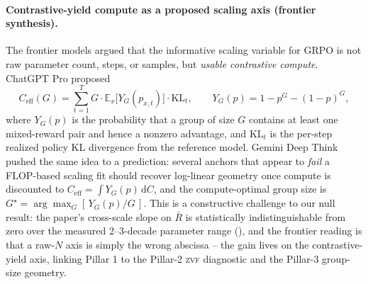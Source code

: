 \paragraph{Contrastive-yield compute as a proposed scaling axis (frontier synthesis).}
The frontier models argued that the informative scaling variable for GRPO is
not raw parameter count, steps, or samples, but \emph{usable contrastive
compute}. ChatGPT Pro proposed
\begin{equation}
  \label{eq:frontier-ceff}
  C_{\mathrm{eff}}(G) = \sum_{t=1}^{T} G \cdot
      \mathbb{E}_x\!\bigl[Y_G(p_{x,t})\bigr] \cdot \mathrm{KL}_t,
  \qquad
  Y_G(p) = 1 - p^{G} - (1-p)^{G},
\end{equation}
where $Y_G(p)$ is the probability that a group of size $G$ contains at least
one mixed-reward pair and hence a nonzero advantage, and $\mathrm{KL}_t$ is the per-step realized policy KL divergence from the reference model. Gemini Deep Think pushed
the same idea to a prediction: several anchors that appear to \emph{fail} a
FLOP-based scaling fit should recover log-linear geometry once compute is
discounted to $C_{\mathrm{eff}}=\int Y_G(p)\,\mathrm{d}C$, and the
compute-optimal group size is $G^\star = \arg\max_G [\,Y_G(p)/G\,]$. This is a
constructive challenge to our null result: the paper's cross-scale slope on
$\bar R$ is statistically indistinguishable from zero over the measured 2--3-decade
parameter range (), and the frontier reading is that a
raw-$N$ axis is simply the wrong abscissa -- the gain lives on the
contrastive-yield axis, linking Pillar 1 to the Pillar-2 \textsc{zvf}
diagnostic and the Pillar-3 group-size geometry.


